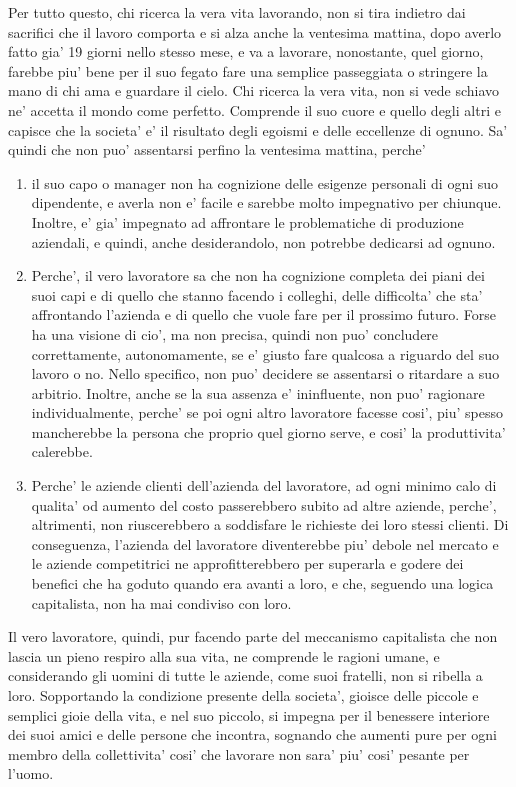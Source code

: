 Per tutto questo, chi ricerca la vera vita lavorando, non si tira indietro dai sacrifici che il lavoro comporta e si alza anche la ventesima mattina, dopo averlo fatto gia' 19 giorni nello stesso mese, e va a lavorare, nonostante, quel giorno, farebbe piu' bene per il suo fegato fare una semplice passeggiata o stringere la mano di chi ama e guardare il cielo. Chi ricerca la vera vita, non si vede schiavo ne' accetta il mondo come perfetto. Comprende il suo cuore e quello degli altri e capisce che la societa' e' il risultato degli egoismi e delle eccellenze di ognuno. Sa' quindi che non puo' assentarsi perfino la ventesima mattina, perche'
\begin{enumerate}
    \item il suo capo o manager non ha cognizione delle esigenze personali di ogni suo dipendente, e averla non e' facile e sarebbe molto impegnativo per chiunque. Inoltre, e' gia' impegnato ad affrontare le problematiche di produzione aziendali, e quindi, anche desiderandolo, non potrebbe dedicarsi ad ognuno.
    \item Perche', il vero lavoratore sa che non ha cognizione completa dei piani dei suoi capi e di quello che stanno facendo i colleghi, delle difficolta' che sta' affrontando l'azienda e di quello che vuole fare per il prossimo futuro.
   Forse ha una visione di cio', ma non precisa, quindi non puo' concludere correttamente, autonomamente, se e' giusto fare qualcosa a riguardo del suo lavoro o no. Nello specifico, non puo' decidere se assentarsi o ritardare a suo arbitrio. Inoltre, anche se la sua assenza e' ininfluente, non puo' ragionare individualmente, perche' se poi ogni altro lavoratore facesse cosi', piu' spesso mancherebbe la persona che proprio quel giorno serve, e cosi' la produttivita' calerebbe.
    \item Perche' le aziende clienti dell'azienda del lavoratore, ad ogni minimo calo di qualita' od aumento del costo passerebbero subito ad altre aziende, perche', altrimenti, non riuscerebbero a soddisfare le richieste dei loro stessi clienti. Di conseguenza, l'azienda del lavoratore diventerebbe piu' debole nel mercato e le aziende competitrici ne approfitterebbero per superarla e godere dei benefici che ha goduto quando era avanti a loro, e che, seguendo una logica capitalista, non ha mai condiviso con loro.

\end{enumerate}
Il vero lavoratore, quindi, pur facendo parte del meccanismo capitalista che non lascia un pieno respiro alla sua vita,  ne comprende le ragioni umane, e considerando gli uomini di tutte le aziende, come suoi fratelli, non si ribella a loro. Sopportando la condizione presente della societa', gioisce delle piccole e semplici gioie della vita, e nel suo piccolo, si impegna per il benessere interiore dei suoi amici e delle persone che incontra,  sognando che aumenti pure per ogni membro della collettivita' cosi' che lavorare non sara' piu' cosi' pesante per l'uomo.

